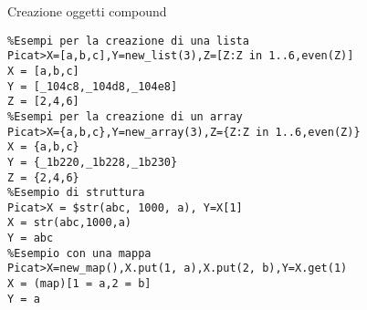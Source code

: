 \iffalse
Qui possiamo vedere un po' di esempi per la creazione di array, liste, strutture e mappe
Liste e array possono essere creati elencando gli elementi, con new_list e new_array oppure con list e array comprehension
Per creare le strutture invece è necessario anteporre il dollaro prima del nome della struttura per far capire al sistema che non si tratta di una chiamata di funzione
le mappe si creano con la funzione new_map e poi è possibile inserire gli elementi con la funzione put e ricavarli invece con la funzione get. Nel caso venga richiesto il get da una mappa senza che tale chiave sia presente allora viene lanciata una eccezione, per evitarlo è possibile aggiungere un valore di default quando si fa la chiamata
\fi

\begin{frame}[fragile, shrink=1]{Creazione oggetti compound}
	
	\begin{lstlisting}
%Esempi per la creazione di una lista
Picat>X=[a,b,c],Y=new_list(3),Z=[Z:Z in 1..6,even(Z)]
X = [a,b,c]
Y = [_104c8,_104d8,_104e8]
Z = [2,4,6]
%Esempi per la creazione di un array
Picat>X={a,b,c},Y=new_array(3),Z={Z:Z in 1..6,even(Z)}
X = {a,b,c}
Y = {_1b220,_1b228,_1b230}
Z = {2,4,6}
%Esempio di struttura
Picat>X = $str(abc, 1000, a), Y=X[1]
X = str(abc,1000,a)
Y = abc
%Esempio con una mappa
Picat>X=new_map(),X.put(1, a),X.put(2, b),Y=X.get(1)
X = (map)[1 = a,2 = b]
Y = a
	\end{lstlisting}

\end{frame}